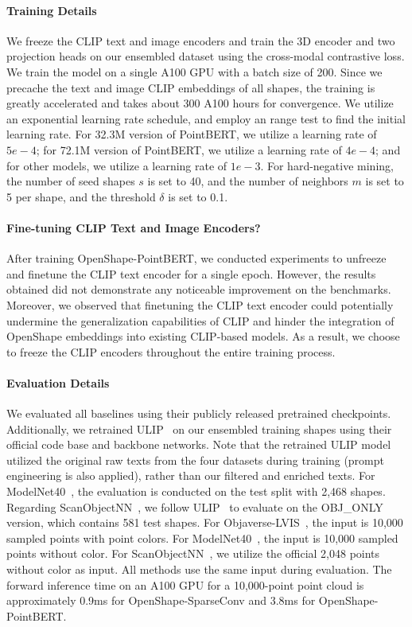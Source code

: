 \paragraph{Training Details}

We freeze the CLIP text and image encoders and train the 3D encoder and two projection heads on our ensembled dataset using the cross-modal contrastive loss. We train the model on a single A100 GPU with a batch size of 200. Since we precache the text and image CLIP embeddings of all shapes, the training is greatly accelerated and takes about 300 A100 hours for convergence. We utilize an exponential learning rate schedule, and employ an range test to find the initial learning rate. For 32.3M version of PointBERT, we utilize a learning rate of $5e-4$; for 72.1M version of PointBERT, we utilize a learning rate of $4e-4$; and for other models, we utilize a learning rate of $1e-3$. For hard-negative mining, the number of seed shapes $s$ is set to 40, and the number of neighbors $m$ is set to 5 per shape, and the threshold $\delta$ is set to 0.1. 

\paragraph{Fine-tuning CLIP Text and Image Encoders?}

After training OpenShape-PointBERT, we conducted experiments to unfreeze and finetune the CLIP text encoder for a single epoch. However, the results obtained did not demonstrate any noticeable improvement on the benchmarks. Moreover, we observed that finetuning the CLIP text encoder could potentially undermine the generalization capabilities of CLIP and hinder the integration of OpenShape embeddings into existing CLIP-based models. As a result, we choose to freeze the CLIP encoders throughout the entire training process.

\paragraph{Evaluation Details} We evaluated all baselines using their publicly released pretrained checkpoints. Additionally, we retrained ULIP~\cite{xue2022ulip} on our ensembled training shapes using their official code base and backbone networks. Note that the retrained ULIP model utilized the original raw texts from the four datasets during training (prompt engineering is also applied), rather than our filtered and enriched texts. For ModelNet40~\cite{wu20153d}, the evaluation is conducted on the test split with 2,468 shapes. Regarding ScanObjectNN~\cite{uy2019revisiting}, we follow ULIP~\cite{xue2022ulip} to evaluate on the OBJ\_ONLY version, which contains 581 test shapes. For Objaverse-LVIS~\cite{objaverse}, the input is 10,000 sampled points with point colors. For ModelNet40~\cite{wu20153d}, the input is 10,000 sampled points without color. For ScanObjectNN~\cite{uy2019revisiting}, we utilize the official 2,048 points without color as input. All methods use the same input during evaluation. The forward inference time on an A100 GPU for a 10,000-point point cloud is approximately 0.9ms for OpenShape-SparseConv and 3.8ms for OpenShape-PointBERT.


